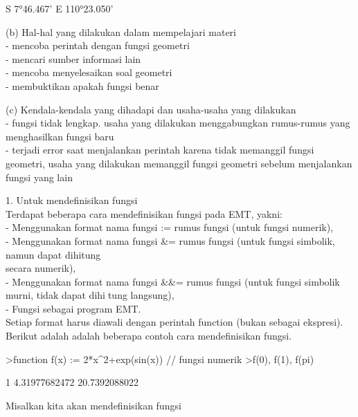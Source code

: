 \documentclass[a4paper,10pt]{article}
\begin{document}
\begin{eulernotebook}
\begin{eulercomment}
\begin{eulercomment}
\begin{eulercomment}
\begin{eulercomment}
\begin{euleroutput}
  S 7°46.467' E 110°23.050'
\end{euleroutput}
\begin{eulercomment}
(b) Hal-hal yang dilakukan dalam mempelajari materi\\
- mencoba perintah dengan fungsi geometri\\
- mencari sumber informasi lain \\
- mencoba menyelesaikan soal geometri\\
- membuktikan apakah fungsi benar

(c) Kendala-kendala yang dihadapi dan usaha-usaha yang dilakukan\\
- fungsi tidak lengkap. usaha yang dilakukan menggabungkan rumus-rumus
yang menghasilkan fungsi baru\\
- terjadi error saat menjalankan perintah karena tidak memanggil
fungsi geometri, usaha yang dilakukan memanggil fungsi geometri
sebelum menjalankan fungsi yang lain
\end{eulercomment}
\begin{eulercomment}
1. Untuk mendefinisikan fungsi\\
Terdapat beberapa cara mendefinisikan fungsi pada EMT, yakni:\\
- Menggunakan format nama fungsi := rumus fungsi (untuk fungsi
numerik),\\
- Menggunakan format nama fungsi \&= rumus fungsi (untuk fungsi
simbolik, namun dapat dihitung\\
secara numerik),\\
- Menggunakan format nama fungsi \&\&= rumus fungsi (untuk fungsi
simbolik murni, tidak dapat dihitung langsung),\\
- Fungsi sebagai program EMT.\\
Setiap format harus diawali dengan perintah function (bukan sebagai
ekspresi).\\
Berikut adalah adalah beberapa contoh cara mendefinisikan fungsi.
\end{eulercomment}
\begin{eulerprompt}
>function f(x) := 2*x^2+exp(sin(x)) // fungsi numerik
>f(0), f(1), f(pi)
\end{eulerprompt}
\begin{euleroutput}
  1
  4.31977682472
  20.7392088022
\end{euleroutput}
\begin{eulercomment}
Misalkan kita akan mendefinisikan fungsi


\end{eulercomment}
\end{eulercomment}
\end{eulercomment}
\end{eulercomment}
\end{eulercomment}
\end{eulernotebook}
\end{document}
